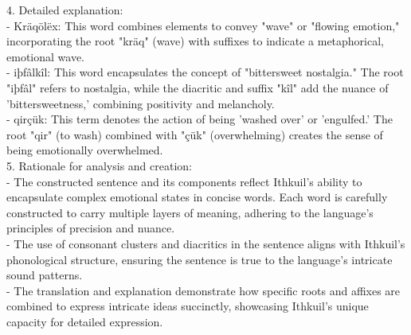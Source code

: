 \begin{tcolorbox}[breakable,boxrule=0.5pt,sharp corners,fontupper=\small,
colback=green!10, colframe=green!50!black, title={Success: Creative Conlang Analysis and Sample Creation}]
4. Detailed explanation:\\
   - Kräqölëx: This word combines elements to convey "wave" or "flowing emotion," incorporating the root "kräq" (wave) with suffixes to indicate a metaphorical, emotional wave.\\
   - iþfâlkîl: This word encapsulates the concept of "bittersweet nostalgia." The root "iþfâl" refers to nostalgia, while the diacritic and suffix "kîl" add the nuance of 'bittersweetness,' combining positivity and melancholy.\\
   - qirçük: This term denotes the action of being 'washed over' or 'engulfed.' The root "qir" (to wash) combined with "çük" (overwhelming) creates the sense of being emotionally overwhelmed.\\

5. Rationale for analysis and creation:\\
   - The constructed sentence and its components reflect Ithkuil's ability to encapsulate complex emotional states in concise words. Each word is carefully constructed to carry multiple layers of meaning, adhering to the language's principles of precision and nuance.\\
   - The use of consonant clusters and diacritics in the sentence aligns with Ithkuil's phonological structure, ensuring the sentence is true to the language's intricate sound patterns.\\
   - The translation and explanation demonstrate how specific roots and affixes are combined to express intricate ideas succinctly, showcasing Ithkuil's unique capacity for detailed expression.
\end{tcolorbox}

